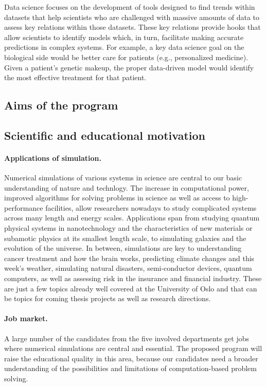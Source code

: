 \documentclass[%
oneside,                 %
final,                   %
10pt]{article}
\begin{document}
Data science focuses on the development of tools designed to find
trends within datasets that help scientists who are challenged with
massive amounts of data to assess key relations within those
datasets. These key relations provide hooks that allow scientists to
identify models which, in turn, facilitate making accurate predictions
in complex systems. For example, a key data science goal on the
biological side would be better care for patients (e.g., personalized
medicine). Given a patient’s genetic makeup, the proper data-driven
model would identify the most effective treatment for that patient.

\subsection{Aims of the program}

\subsection{Scientific and educational motivation}


\paragraph{Applications of simulation.}
Numerical simulations of various systems in science are central to our
basic understanding of nature and technlogy.
The increase in computational power,
improved algorithms for solving problems in science as well as access
to high-performance facilities, allow researchers nowadays to study
complicated systems across many length and energy scales. Applications
span from studying quantum physical systems in nanotechnology and the
characteristics of new materials or subamotic physics at its smallest
length scale, to simulating galaxies and the evolution of the universe.
In between, simulations are key to understanding
cancer treatment and how the brain works,
predicting climate changes and this week's weather,
simulating natural disasters, semi-conductor devices,
quantum computers, as well as assessing risk in the insurance and
financial industry. These are just a few topics
already well covered at the University of Oslo and that can be
topics for coming thesis projects as well as research directions.




\paragraph{Job market.}
A large number of the candidates from the five involved departments
get jobs where numerical simulations are central and essential. The proposed
program will raise the educational quality in this area, because
our candidates need a broader understanding of the possibilities
and limitations of computation-based problem solving.
\end{document}
